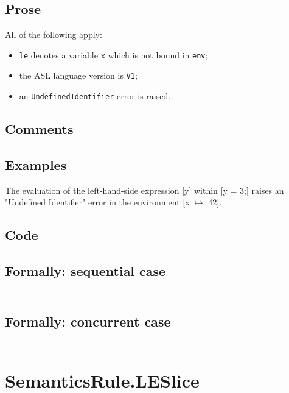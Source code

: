 \documentclass{book}
\begin{document}
    \subsection{Prose}
    All of the following apply:
    \begin{itemize}
    \item \texttt{le} denotes a variable \texttt{x} which is not bound in \texttt{env};
    \item the ASL language version is \texttt{V1};
    \item an \texttt{UndefinedIdentifier} error is raised.
    \end{itemize}

    \subsection{Comments}

    \subsection{Examples}
    The evaluation of the left-hand-side expression [y] within [y = 3;] raises an "Undefined Identifier" error in the environment [x $\mapsto$ 42].

  \subsection{Code}

  \subsection{Formally: sequential case}
  \begin{align}
  \end{align} 

  \subsection{Formally: concurrent case}
  \begin{align}
  \end{align} 

\section{SemanticsRule.LESlice \label{sec:SemanticsRule.LESlice}}
\end{document}
